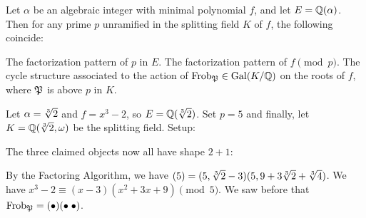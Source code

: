\begin{theorem}
	\label{thm:factor_poly_frob}
	Let $\alpha$ be an algebraic integer with minimal polynomial $f$,
	and let $E = \mathbb Q(\alpha)$.
	Then for any prime $p$ unramified in the splitting field $K$ of $f$,
	the following coincide:
	\begin{enumerate}[(i)]
		\ii The factorization pattern of $p$ in $E$.
		\ii The factorization pattern of $f \pmod p$.
		\ii The cycle structure associated to the action
		of $\mathrm{Frob}_{\mathfrak P} \in \operatorname{Gal}(K/\mathbb Q)$ on the roots of $f$,
		where $\mathfrak P$ is above $p$ in $K$.
	\end{enumerate}
\end{theorem}
\begin{example}
	Let $\alpha = \sqrt[3]{2}$ and $f = x^3-2$, so $E = \mathbb Q(\sqrt[3]{2})$.
	Set $p=5$ and finally, let $K = \mathbb Q(\sqrt[3]{2}, \omega)$ be the splitting field.
	Setup:
	\begin{center}
	\end{center}
	The three claimed objects now all have shape $2+1$:
	\begin{enumerate}[(i)]
		\ii By the Factoring Algorithm, we have
		$(5) = (5, \sqrt[3]{2}-3)(5, 9+3\sqrt[3]{2}+\sqrt[3]{4})$.
		\ii We have $x^3-2 \equiv (x-3)(x^2+3x+9) \pmod 5$.
		\ii We saw before that $\mathrm{Frob}_{\mathfrak P} = (\bullet)(\bullet \; \bullet)$.
	\end{enumerate}
\end{example}


